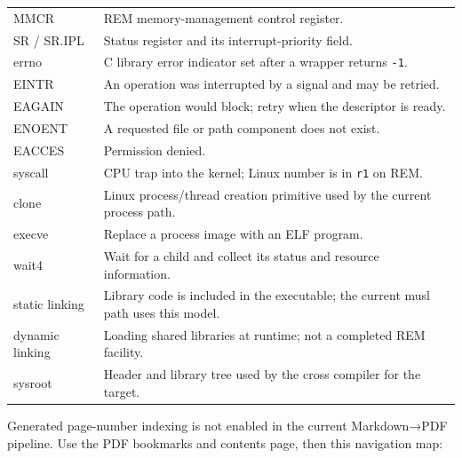 \documentclass[
  oneside,
  openany]{book}
\begin{document}
\begin{longtable}[]{@{}
  >{\raggedright\arraybackslash}p{}
  >{\raggedright\arraybackslash}p{}@{}}
MMCR & REM memory-management control register. \\
SR / SR.IPL & Status register and its interrupt-priority field. \\
errno & C library error indicator set after a wrapper returns
\texttt{-1}. \\
EINTR & An operation was interrupted by a signal and may be retried. \\
EAGAIN & The operation would block; retry when the descriptor is
ready. \\
ENOENT & A requested file or path component does not exist. \\
EACCES & Permission denied. \\
syscall & CPU trap into the kernel; Linux number is in \texttt{r1} on
REM. \\
clone & Linux process/thread creation primitive used by the current
process path. \\
execve & Replace a process image with an ELF program. \\
wait4 & Wait for a child and collect its status and resource
information. \\
static linking & Library code is included in the executable; the current
musl path uses this model. \\
dynamic linking & Loading shared libraries at runtime; not a completed
REM facility. \\
sysroot & Header and library tree used by the cross compiler for the
target. \\
\end{longtable}

Generated page-number indexing is not enabled in the current
Markdown→PDF pipeline. Use the PDF bookmarks and contents page, then
this navigation map:
\end{document}
